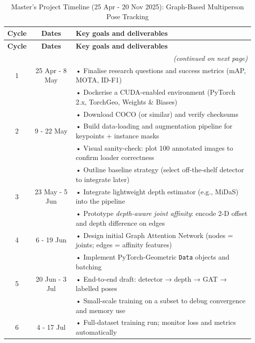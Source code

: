 \begin{longtable}{@{} c c p{10.5cm} @{}}
\caption{Master's Project Timeline (25 Apr - 20 Nov 2025): Graph-Based Multiperson Pose Tracking}
\label{tab:masters-timeline}\\

\toprule
\textbf{Cycle} & \textbf{Dates} & \textbf{Key goals and deliverables} \\
\midrule
\endfirsthead

\toprule
\textbf{Cycle} & \textbf{Dates} & \textbf{Key goals and deliverables} \\
\midrule
\endhead

\midrule
\multicolumn{3}{r}{\small\itshape (continued on next page)}\\
\endfoot

\bottomrule
\endlastfoot
%
1  & 25 Apr - 8 May & • Finalise research questions and success metrics (mAP, MOTA, ID-F1)\\
   &                & • Dockerise a CUDA-enabled environment (PyTorch 2.x, TorchGeo, Weights \& Biases)\\
   &                & • Download COCO (or similar) and verify checksums\\
\midrule
2  & 9 - 22 May & • Build data-loading and augmentation pipeline for keypoints + instance masks\\
   &            & • Visual sanity-check: plot 100 annotated images to confirm loader correctness\\
   &            & • Outline baseline strategy (select off-the-shelf detector to integrate later)\\
\midrule
3  & 23 May - 5 Jun & • Integrate lightweight depth estimator (e.g., MiDaS) into the pipeline\\
   &                 & • Prototype \emph{depth-aware joint affinity}: encode 2-D offset and depth difference on edges\\
\midrule
4  & 6 - 19 Jun & • Design initial Graph Attention Network (nodes = joints; edges = affinity features)\\
   &             & • Implement PyTorch-Geometric \texttt{Data} objects and batching\\
\midrule
5  & 20 Jun - 3 Jul & • End-to-end draft: detector → depth → GAT → labelled poses\\
   &                 & • Small-scale training on a subset to debug convergence and memory use\\
\midrule
6  & 4 - 17 Jul & • Full-dataset training run; monitor loss and metrics automatically\\

\end{longtable}
